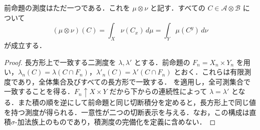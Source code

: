 \begin{prop}[積測度の一意性と切断表示]
前命題の測度はただ一つである．これを $\mu\otimes\nu$ と記す．すべての $C\in\mathcal A\otimes\mathcal B$ について
\[
(\mu\otimes\nu)(C)=\int_X\nu(C_x)\,d\mu=\int_Y\mu(C^y)\,d\nu
\]
が成立する．
\end{prop}
\begin{proof}
長方形上で一致する二測度を $\lambda,\lambda'$ とする．前命題の $F_n=X_n\times Y_n$ を用い，$\lambda_n(C)=\lambda(C\cap F_n)$，$\lambda'_n(C)=\lambda'(C\cap F_n)$ とおく．これらは有限測度であり，全体集合及びすべての長方形で一致する． を適用し，全可測集合で一致することを得る．$F_n\uparrow X\times Y$ だから下からの連続性によって $\lambda=\lambda'$ となる．また積の順を逆にして前命題と同じ切断積分を定めると，長方形上で同じ値を持つ測度が得られる．一意性が二つの切断表示を与える．なお，この構成は直積$\sigma$-加法族上のものであり，積測度の完備化を定義に含めない．
\end{proof}
